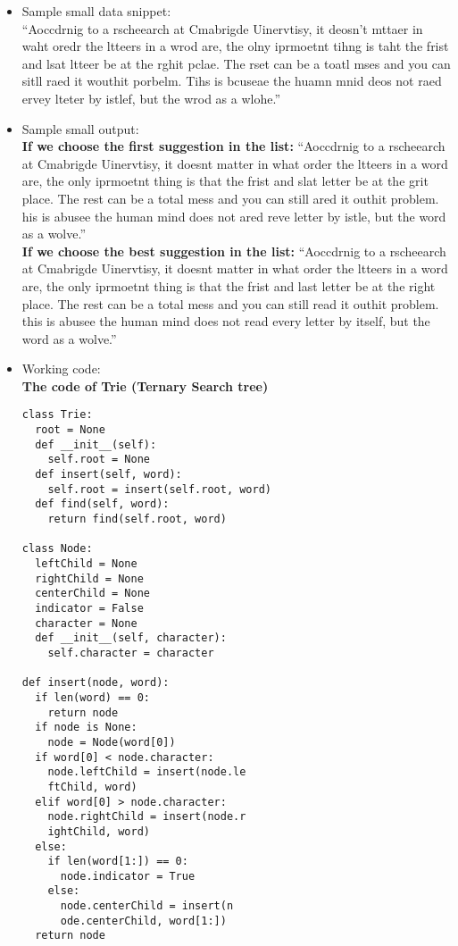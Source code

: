 \begin{itemize} 
\item{}
Sample small data snippet: \\
``Aoccdrnig to a rscheearch at Cmabrigde Uinervtisy, it deosn't mttaer in waht oredr the ltteers in a wrod are, the olny iprmoetnt tihng is taht the frist and lsat ltteer be at the rghit pclae. The rset can be a toatl mses and you can sitll raed it wouthit porbelm. Tihs is bcuseae the huamn mnid deos not raed ervey lteter by istlef, but the wrod as a wlohe.''
\item{}
Sample small output: \\
\textbf{If we choose the first suggestion in the list:} ``Aoccdrnig to a rscheearch at Cmabrigde Uinervtisy, it doesnt matter in what order the ltteers in a word are, the only iprmoetnt thing is that the frist and slat letter be at the grit place. The rest can be a total mess and you can still ared it outhit problem. his is abusee the human mind does not ared reve letter by istle, but the word as a wolve.'' \\
\textbf{If we choose the best suggestion in the list:} ``Aoccdrnig to a rscheearch at Cmabrigde Uinervtisy, it doesnt matter in what order the ltteers in a word are, the only iprmoetnt thing is that the frist and last letter be at the right place. The rest can be a total mess and you can still read it outhit problem. this is abusee the human mind does not read every letter by itself, but the word as a wolve.''
\item{}

Working code: \\
\textbf{The code of Trie (Ternary Search tree)} \\
\begin{verbatim}
class Trie:
  root = None
  def __init__(self):
    self.root = None
  def insert(self, word):
    self.root = insert(self.root, word)
  def find(self, word):
    return find(self.root, word)

class Node:
  leftChild = None
  rightChild = None
  centerChild = None
  indicator = False
  character = None
  def __init__(self, character):
    self.character = character

def insert(node, word):
  if len(word) == 0:
    return node
  if node is None:
    node = Node(word[0])
  if word[0] < node.character:
    node.leftChild = insert(node.le
    ftChild, word)
  elif word[0] > node.character:
    node.rightChild = insert(node.r
    ightChild, word)
  else:
    if len(word[1:]) == 0:
      node.indicator = True
    else:
      node.centerChild = insert(n
      ode.centerChild, word[1:])
  return node


\end{verbatim}
\end{itemize}
